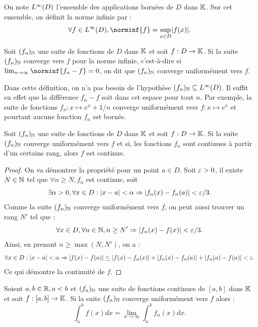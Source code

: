\documentclass{article}
\begin{document}
\begin{defn}
On note $L^{\infty}(D)$ l'ensemble des applications bornées de $D$ dans $\mathbb{K}$. Sur cet ensemble, on définit la norme infinie par :
\[ \forall f \in \Linf(D), \norminf{f} = \sup_{x \in D} \abs{f(x)} . \]
\end{defn}

\begin{defn}
Soit $(f_n)_{\mathbb{N}}$ une suite de fonctions de $D$ dans $\mathbb{K}$ et soit $f:D \to \mathbb{K}$. Si la suite $(f_n)_{\mathbb{N}}$ converge vers $f$ pour la norme infinie,
c'est-à-dire si $\lim_{n \to \infty} \norminf{f_n-f} = 0$, on dit que $(f_n)_{\mathbb{N}}$ converge uniformément vers $f$.
\end{defn}

\begin{rmq}
Dans cette définition, on n'a pas besoin de l'hypothèse $(f_n)_{\mathbb{N}} \subseteq L^{\infty}(D)$. Il suffit en effet que la différence $f_n - f$ soit 
dans cet espace pour tout $n$. Par exemple, la suite de fonctions $f_n : x \mapsto e^x + 1/n$ converge uniformément vers 
$f : x \mapsto e^x$ et pourtant aucune fonction $f_n$ est bornée.
\end{rmq}

\begin{thm}[Continuité]
\label{thm:continuité}
Soit $(f_n)_{\mathbb{N}}$ une suite de fonctions de $D$ dans $\mathbb{K}$ et soit $f:D \to \mathbb{K}$. Si la suite $(f_n)_{\mathbb{N}}$ converge uniformément vers $f$ et si,
les fonctions $f_n$ sont continues à partir d'un certains rang, alors $f$ est continue.
\end{thm}

\begin{proof}
On va démontrer la propriété pour un point $a \in D$. Soit $\varepsilon >0$, il existe $N \in \mathbb{N}$ tel que $\forall n \geq N, f_n$ est continue, soit
\[ \exists \alpha > 0, \forall x \in D : \lvert x-a\rvert < \alpha \Rightarrow \lvert f_n(x) - f_n(a)\rvert < \varepsilon/3 . \]
Comme la suite $(f_n)_{\mathbb{N}}$ converge uniformément vers $f$, on peut aussi trouver un rang $N'$ tel que :
\[ \forall x \in D, \forall n \in \mathbb{N}, n \geq N' \Rightarrow \lvert f_n(x)-f(x)\rvert < \varepsilon/3 . \]
Ainsi, en prenant $n \geq \max(N, N')$, on a :
\[ \forall x \in D : \lvert x-a\rvert < \alpha \Rightarrow \lvert f(x)-f(a)\rvert \leq \lvert f(x)-f_n(x)\rvert + \lvert f_n(x)-f_n(a)\rvert + \lvert f_n(a)-f(a)\rvert < \varepsilon . \]
Ce qui démontre la continuité de $f$. 
\end{proof}

\begin{thm}[Intégration]
\label{thm:intégration}
Soient $a, b \in \mathbb{R}, a < b$ et $(f_n)_{\mathbb{N}}$ une suite de fonctions continues de $[a,b]$ dans $\mathbb{K}$ et soit $f : [a,b] \to \mathbb{K}$.
Si la suite $(f_n)_{\mathbb{N}}$ converge uniformément vers $f$ alors :
\[ \int_a^b f(x) dx = \lim_{n \to \infty} \int_a^b f_n(x) dx . \]
\end{thm}
\end{document}
